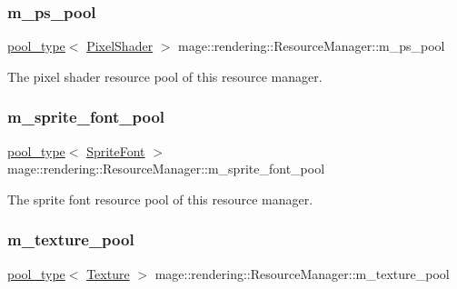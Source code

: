 \subsubsection{\texorpdfstring{m\+\_\+ps\+\_\+pool}{m\_ps\_pool}}
{\footnotesize\ttfamily \hyperlink{classmage_1_1rendering_1_1_resource_manager_ab21a4e280087032ee533f267bd9bf602}{pool\+\_\+type}$<$ \hyperlink{namespacemage_1_1rendering_a19905114913398d5073148f6c416e1b7}{Pixel\+Shader} $>$ mage\+::rendering\+::\+Resource\+Manager\+::m\+\_\+ps\+\_\+pool\hspace{0.3cm}{\ttfamily [private]}}

The pixel shader resource pool of this resource manager. \hypertarget{classmage_1_1rendering_1_1_resource_manager_a0319ef8aad59a69098e6c0a89b6c912e}{}\label{classmage_1_1rendering_1_1_resource_manager_a0319ef8aad59a69098e6c0a89b6c912e} 
\subsubsection{\texorpdfstring{m\+\_\+sprite\+\_\+font\+\_\+pool}{m\_sprite\_font\_pool}}
{\footnotesize\ttfamily \hyperlink{classmage_1_1rendering_1_1_resource_manager_ab21a4e280087032ee533f267bd9bf602}{pool\+\_\+type}$<$ \hyperlink{classmage_1_1rendering_1_1_sprite_font}{Sprite\+Font} $>$ mage\+::rendering\+::\+Resource\+Manager\+::m\+\_\+sprite\+\_\+font\+\_\+pool\hspace{0.3cm}{\ttfamily [private]}}

The sprite font resource pool of this resource manager. \hypertarget{classmage_1_1rendering_1_1_resource_manager_aaf5faede84cdce3bd2589936d5ba3b18}{}\label{classmage_1_1rendering_1_1_resource_manager_aaf5faede84cdce3bd2589936d5ba3b18} 
\subsubsection{\texorpdfstring{m\+\_\+texture\+\_\+pool}{m\_texture\_pool}}
{\footnotesize\ttfamily \hyperlink{classmage_1_1rendering_1_1_resource_manager_ab21a4e280087032ee533f267bd9bf602}{pool\+\_\+type}$<$ \hyperlink{classmage_1_1rendering_1_1_texture}{Texture} $>$ mage\+::rendering\+::\+Resource\+Manager\+::m\+\_\+texture\+\_\+pool\hspace{0.3cm}{\ttfamily [private]}}

